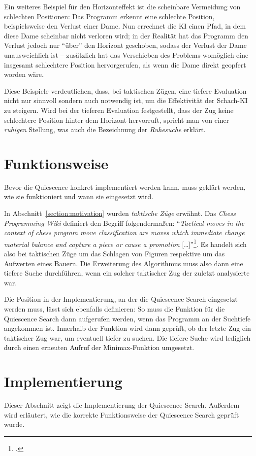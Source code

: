 Ein weiteres Beispiel für den Horizonteffekt ist die scheinbare Vermeidung von schlechten Positionen: Das Programm erkennt eine schlechte Position, beispielsweise den Verlust einer Dame. Nun errechnet die KI einen Pfad, in dem diese Dame scheinbar nicht verloren wird; in der Realität hat das Programm den Verlust jedoch nur "`über"' den Horizont geschoben, sodass der Verlust der Dame unausweichlich ist -- zusätzlich hat das Verschieben des Problems womöglich eine insgesamt schlechtere Position hervorgerufen, als wenn die Dame direkt geopfert worden wäre.

Diese Beispiele verdeutlichen, dass, bei taktischen Zügen, eine tiefere Evaluation nicht nur sinnvoll sondern auch notwendig ist, um die Effektivität der Schach-KI zu steigern. Wird bei der tieferen Evaluation festgestellt, dass der Zug keine schlechtere Position hinter dem Horizont hervorruft, spricht man von einer \textit{ruhigen} Stellung, was auch die Bezeichnung der \textit{Ruhesuche} erklärt.

\section{Funktionsweise}
Bevor die Quiescence konkret implementiert werden kann, muss geklärt werden, wie sie funktioniert und wann sie eingesetzt wird.

In Abschnitt~\ref{section:motivation} wurden \textit{taktische Züge} erwähnt. Das \textit{Chess Programming Wiki} definiert den Begriff folgendermaßen: "`\textit{Tactical moves in the context of chess program move classification are moves which immediate change material balance and capture a piece or cause a promotion} […]"'\footcite{chessprogramming}. Es handelt sich also bei taktischen Züge um das Schlagen von Figuren respektive um das Aufwerten eines Bauern. Die Erweiterung des Algorithmus muss also dann eine tiefere Suche durchführen, wenn ein solcher taktischer Zug der zuletzt analysierte war. 

Die Position in der Implementierung, an der die Quiescence Search eingesetzt werden muss, lässt sich ebenfalls definieren: So muss die Funktion für die Quiescence Search dann aufgerufen werden, wenn das Programm an der Suchtiefe angekommen ist. Innerhalb der Funktion wird dann geprüft, ob der letzte Zug ein taktischer Zug war, um eventuell tiefer zu suchen. Die tiefere Suche wird lediglich durch einen erneuten Aufruf der Minimax-Funktion umgesetzt.

\section{Implementierung}
Dieser Abschnitt zeigt die Implementierung der Quiescence Search. Außerdem wird erläutert, wie die korrekte Funktionsweise der Quiescence Search geprüft wurde.

